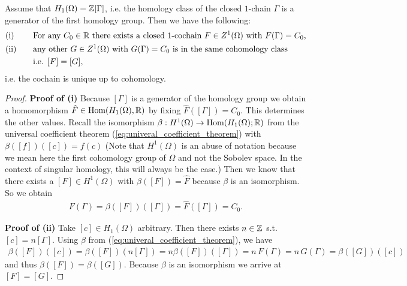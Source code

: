 \documentclass[../master_thesis.tex]{subfiles}
\begin{document}
\begin{proposition}\label{prop:uniqueness_cochain}
    Assume that $H_1(\Omega) = \mathbb{Z} [\Gamma]$, i.e. the homology 
    class of the 
    closed $1$-chain $\Gamma$ is a generator of the first homology group.
    Then we have the following:
\begin{alignat*}{2}
    &\text{\normalfont{(i)}} \quad&&\text{For any $C_0 \in \mathbb{R}$ there exists a closed $1$-cochain 
        $F \in Z^1(\Omega)$ with $F(\Gamma) = C_0$,}
    \\ & \text{\normalfont{(ii)}} \quad&&\text{any other $G \in Z^1(\Omega)$ with $G(\Gamma) = C_0$ 
        is in the same cohomology class}
    \\ & &&\text{i.e. $[F] = [G]$},
\end{alignat*}    
i.e. the cochain is unique up to cohomology.
\end{proposition}
\begin{proof}
    \textbf{Proof of (i)} %
    Because $[\Gamma]$ is a generator of the homology group we  obtain a 
    homomorphism $\hat{F} \in \text{Hom}(H_1(\Omega),\mathbb{R})$ by fixing
    $\hat{F}([\Gamma]) = C_0$. 
    This determines the other values.
    Recall the isomorphism $\beta : H^1(\Omega) \rightarrow 
    \text{Hom}(H_1(\Omega);\mathbb{R})$ from the universal coefficient theorem 
    (\ref{eq:univeral_coefficient_theorem}) with 
    $\beta([f])([c]) = f(c)$
    (Note that $H^1(\Omega)$ is an abuse of notation 
    because we mean here the first cohomology group of $\Omega$ and not the 
    Sobolev space. In the context of singular homology, this will always be the
    case.)
    Then we know that there exists
    a $[F] \in H^1(\Omega)$ with $\beta([F]) = \hat{F}$ because $\beta$ is an
    isomorphism. So we obtain
    \begin{align*}
        F(\Gamma) = \beta([F])([\Gamma]) = \hat{F}([\Gamma]) = C_0.
    \end{align*}

    \textbf{Proof of (ii)} %
    Take $[c] \in H_1(\Omega)$ arbitrary. 
    Then there exists  $n \in \mathbb{Z}$ s.t.
    $[c] = n [\Gamma]$.
    Using $\beta$ from (\ref{eq:univeral_coefficient_theorem}),
    we have
    \begin{align*}
        \beta([F])([c]) = \beta([F])(n [\Gamma]) 
        = n \beta([F])([\Gamma]) = n \, F(\Gamma) = n \, G(\Gamma) = 
        \beta([G])([c])
    \end{align*}
    and thus $\beta([F]) = \beta([G])$. Because $\beta$ is an isomorphism
    we arrive at $[F] = [G]$.
\end{proof}
\end{document}
